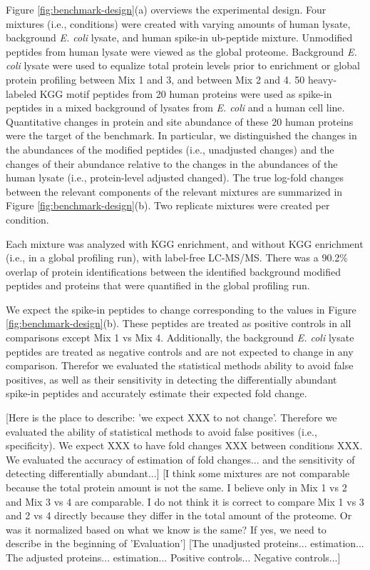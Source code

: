 \documentclass[mcp]{article}
\numberwithin{table}{section}
\def\todo#1{{\color{red}[#1]}}
\begin{document}
\medskip {} Figure \ref{fig:benchmark-design}(a) overviews the experimental design. Four mixtures (i.e., conditions) were created with varying amounts of human lysate, background {\it E. coli} lysate, and human spike-in ub-peptide mixture. Unmodified peptides from human lysate were viewed as the global proteome. Background {\it E. coli} lysate were used to equalize total protein levels prior to enrichment or global protein profiling between Mix 1 and 3, and between Mix 2 and 4.  50 heavy-labeled KGG motif peptides from 20 human proteins were used as spike-in peptides in a mixed background of lysates from {\it E. coli} and a human cell line. Quantitative changes in protein and site abundance of these 20 human proteins were the target of the benchmark. In particular, we distinguished the changes in the abundances of the modified peptides (i.e., unadjusted changes) and the changes of their abundance relative to the changes in the abundances of the human lysate (i.e., protein-level adjusted changed). The true log-fold changes between the relevant components of the relevant mixtures are summarized in Figure \ref{fig:benchmark-design}(b).  Two replicate mixtures were created per condition. 

\medskip {} Each mixture was analyzed with KGG enrichment, and without KGG enrichment (i.e., in a global profiling run), with label-free LC-MS/MS. There was a 90.2\% overlap of protein identifications between the identified background modified peptides and proteins that were quantified in the global profiling run.

\medskip {} We expect the spike-in peptides to change corresponding to the values in Figure \ref{fig:benchmark-design}(b). These peptides are treated as positive controls in all comparisons except Mix 1 vs Mix 4. Additionally, the background {\it E. coli} lysate peptides are treated as negative controls and are not expected to change in any comparison. Therefor we evaluated the statistical methods ability to avoid false positives, as well as their sensitivity in detecting the differentially abundant spike-in peptides and accurately estimate their expected fold change.


\todo{Here is the place to describe: 'we expect XXX to not change'. Therefore we evaluated the ability of statistical methods to avoid false positives (i.e., specificity). We expect XXX to have fold changes XXX between conditions XXX. We evaluated the accuracy of estimation of fold changes... and the sensitivity of detecting differentially abundant...}  
%
\todo{I think some mixtures are not comparable because the total protein amount is not the same. I believe only in Mix 1 vs 2 and Mix 3 vs 4 are comparable. I do not think it is correct to compare Mix 1 vs 3 and 2 vs 4 directly because they differ in the total amount of the proteome. Or was it normalized based on what we know is the same? If yes, we need to describe in the beginning of 'Evaluation'}  \todo{The unadjusted proteins... estimation... The adjusted proteins... estimation... Positive controls... Negative controls...}
\end{document}
